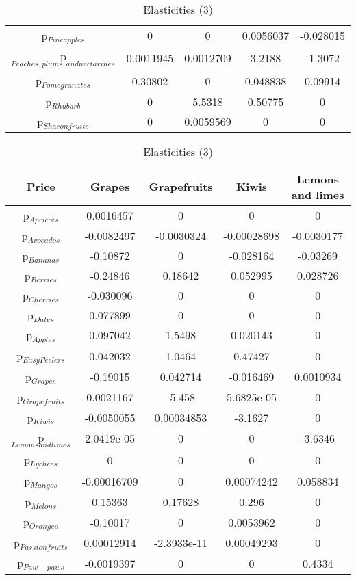 \documentclass[11pt]{article}
\begin{document}
\begin{table}[h]
\begin{center}
\begin{table}[h]
\begin{center}
\begin{tabular}{ccccc}
p$_{Pineapples}$ & 0 & 0 & 0.0056037 & -0.028015 \\ 
p$_{Peaches, plums, and nectarines}$ & 0.0011945 & 0.0012709 & 3.2188 & -1.3072 \\ 
p$_{Pomegranates}$ & 0.30802 & 0 & 0.048838 & 0.09914 \\ 
p$_{Rhubarb}$ & 0 & 5.5318 & 0.50775 & 0 \\ 
p$_{Sharon fruits}$ & 0 & 0.0059569 & 0 & 0 \\ 
\end{tabular}
\end{center}
\end{table}
\begin{table}[h]
\caption{Elasticities (3)}
\label{Table: elasticities 3}
\begin{center}
\begin{tabular}{ccccc}
Price & Grapes & Grapefruits & Kiwis & Lemons and limes \\ \hline
p$_{Apricots}$ & 0.0016457 & 0 & 0 & 0 \\ 
p$_{Avocados}$ & -0.0082497 & -0.0030324 & -0.00028698 & -0.0030177 \\ 
p$_{Bananas}$ & -0.10872 & 0 & -0.028164 & -0.03269 \\ 
p$_{Berries}$ & -0.24846 & 0.18642 & 0.052995 & 0.028726 \\ 
p$_{Cherries}$ & -0.030096 & 0 & 0 & 0 \\ 
p$_{Dates}$ & 0.077899 & 0 & 0 & 0 \\ 
p$_{Apples}$ & 0.097042 & 1.5498 & 0.020143 & 0 \\ 
p$_{Easy Peelers}$ & 0.042032 & 1.0464 & 0.47427 & 0 \\ 
p$_{Grapes}$ & -0.19015 & 0.042714 & -0.016469 & 0.0010934 \\ 
p$_{Grapefruits}$ & 0.0021167 & -5.458 & 5.6825e-05 & 0 \\ 
p$_{Kiwis}$ & -0.0050055 & 0.00034853 & -3.1627 & 0 \\ 
p$_{Lemons and limes}$ & 2.0419e-05 & 0 & 0 & -3.6346 \\ 
p$_{Lychees}$ & 0 & 0 & 0 & 0 \\ 
p$_{Mangos}$ & -0.00016709 & 0 & 0.00074242 & 0.058834 \\ 
p$_{Melons}$ & 0.15363 & 0.17628 & 0.296 & 0 \\ 
p$_{Oranges}$ & -0.10017 & 0 & 0.0053962 & 0 \\ 
p$_{Passion fruits}$ & 0.00012914 & -2.3933e-11 & 0.00049293 & 0 \\ 
p$_{Paw-paws}$ & -0.0019397 & 0 & 0 & 0.4334 \\ 

\end{tabular}
\end{center}
\end{table}
\end{center}
\end{table}
\end{document}
